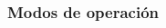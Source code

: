 \documentclass{beamer}
\begin{document}
\begin{frame}
\frametitle{Modos de operación}
\begin{columns}
\begin{column}{0.60\textwidth}
\begin{block}{}
\begin{itemize}


\end{itemize}
\end{block}
\end{column}
\end{columns}
\end{frame}
\end{document}

